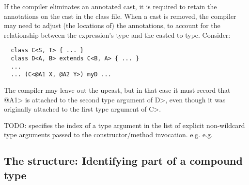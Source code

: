 \documentclass[10pt]{article}
\begin{document}
If the compiler eliminates an annotated cast, it is required to retain the
annotations on the cast in the class file.  When a cast is removed, the
compiler may need to adjust (the locations of) the annotations, to account
for the relationship between the expression's type and the casted-to type.
Consider:

\preverbnegspace
\begin{Verbatim}
  class C<S, T> { ... }
  class D<A, B> extends C<B, A> { ... }
  ...
  ... (C<@A1 X, @A2 Y>) myD ...
\end{Verbatim}

\noindent
The compiler may leave out the upcast, but in that case it must record that
\<@A1> is attached to the second type argument of \<D>, even though it was
originally attached to the first type argument of \<C>.





TODO:  specifies the index of a type argument in the list
       of explicit non-wildcard type arguments passed to the
       constructor/method invocation.
       e.g. 
       e.g. 



\subsection{The  structure:  Identifying part of a compound type\label{class-file:ext:type_path}}

\newcommand{\tpath}[2]{\codefootnotesize{path\_length: #1; path: [#2]}}
\newcommand{\tarray}{\codefootnotesize{ARRAY(0, 0)}}
\newcommand{\tinner}{\codefootnotesize{INNER\_TYPE(1, 0)}}
\newcommand{\twildcard}{\codefootnotesize{WILDCARD(2, 0)}}
\newcommand{\ttypearg}[1]{\codefootnotesize{TYPE\_ARGUMENT(3, #1)}}

\end{document}
